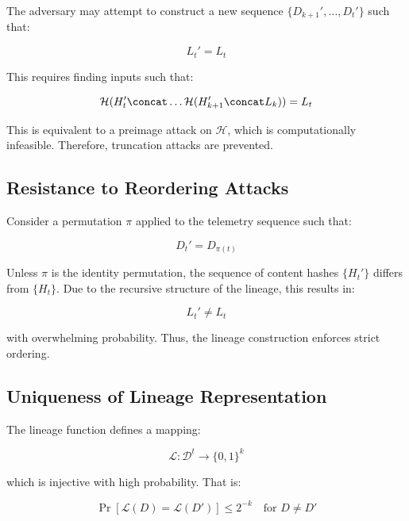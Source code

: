 The adversary may attempt to construct a new sequence $\{D_{k+1}', \dots, D_t'\}$ such that:

\begin{equation}
L_t' = L_t
\end{equation}

This requires finding inputs such that:

\begin{equation}
\mathcal{H}(H_t' \concat \dots \mathcal{H}(H_{k+1}' \concat L_k)) = L_t
\end{equation}

This is equivalent to a preimage attack on $\mathcal{H}$, which is computationally infeasible. Therefore, truncation attacks are prevented.

\subsection{Resistance to Reordering Attacks}

Consider a permutation $\pi$ applied to the telemetry sequence such that:

\begin{equation}
D_t' = D_{\pi(t)}
\end{equation}

Unless $\pi$ is the identity permutation, the sequence of content hashes $\{H_t'\}$ differs from $\{H_t\}$. Due to the recursive structure of the lineage, this results in:

\begin{equation}
L_t' \neq L_t
\end{equation}

with overwhelming probability. Thus, the lineage construction enforces strict ordering.

\subsection{Uniqueness of Lineage Representation}

The lineage function defines a mapping:

\begin{equation}
\mathcal{L}: \mathcal{D}^{t} \rightarrow \{0,1\}^k
\end{equation}

which is injective with high probability. That is:

\begin{equation}
\Pr[\mathcal{L}(D) = \mathcal{L}(D')] \leq 2^{-k} \quad \text{for } D \neq D'
\end{equation}

